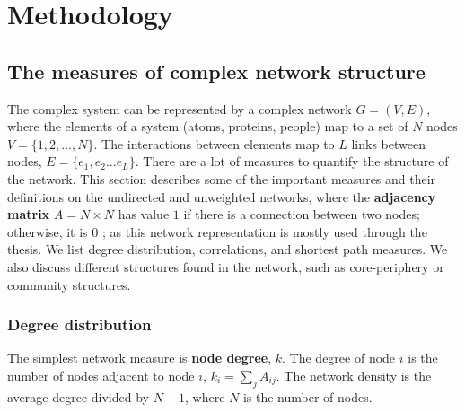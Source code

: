 \chapter{Methodology} %
\label{Ch:Method}

\section{The measures of complex network structure}

The complex system can be represented by a complex network $G=(V, E)$, where the elements of a system (atoms, proteins, people) map to a set of $N$ nodes $V=\{1, 2, ..., N\}$. The interactions between elements map to $L$ links between nodes, $E = \{ e_1, e_2... e_L\}$. There are a lot of measures to quantify the structure of the network. This section describes some of the important measures and their definitions on the undirected and unweighted networks, where the \textbf{adjacency matrix} ${A} = N \times N$ has value $1$ if there is a connection between two nodes; otherwise, it is $0$ \cite{boccaletti2006complex}; as this network representation is mostly used through the thesis. We list degree distribution, correlations, and shortest path measures. We also discuss different structures found in the network, such as core-periphery or community structures.   


\subsection{Degree distribution}

The simplest network measure is \textbf{node degree}, $k$. The degree of node $i$ is %
the number of nodes adjacent %
 to node $i$, $k_i = \sum_j A_{ij}$. The network density is the average degree divided by $N-1$, where $N$ is the number of nodes. %
 
